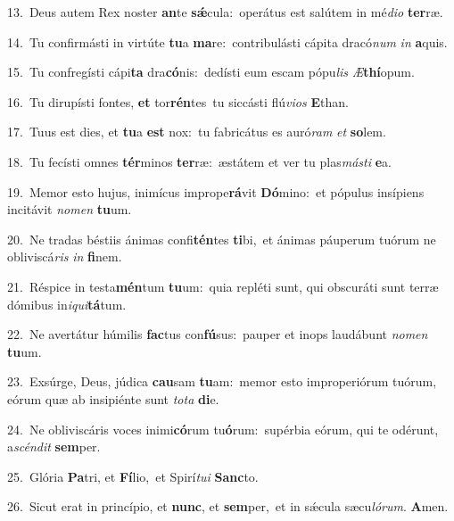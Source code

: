 {\numbfont\textcolor{\numbcolor}{13.}}~Deus autem Rex noster \textbf{an}\-te \textbf{sǽ}\-cula:~\star operátus est salútem in mé\-\textit{di}\-\textit{o} \textbf{ter}\-ræ.\par
{\numbfont\textcolor{\numbcolor}{14.}}~Tu confirmásti in virtúte \textbf{tu}\-a \textbf{ma}\-re:~\star contribulásti cápita dracó\textit{num} \textit{in} \textbf{a}\-quis.\par
{\numbfont\textcolor{\numbcolor}{15.}}~Tu confregísti cápi\textbf{ta} dra\-\textbf{có}\-nis:~\star dedísti eum escam pópu\textit{lis} \textit{Æ}\-\textbf{thí}opum.\par
{\numbfont\textcolor{\numbcolor}{16.}}~Tu dirupísti fontes, \textbf{et} tor\-\textbf{rén}\-tes~\star tu siccásti flú\-\textit{vi}\-\textit{os} \textbf{E}\-than.\par
{\numbfont\textcolor{\numbcolor}{17.}}~Tuus est dies, et \textbf{tu}\-a \textbf{est} nox:~\star tu fabricátus es auró\textit{ram} \textit{et} \textbf{so}\-lem.\par
{\numbfont\textcolor{\numbcolor}{18.}}~Tu fecísti omnes \textbf{tér}\-minos \textbf{ter}\-ræ:~\star æstátem et ver tu plas\-\textit{más}\-\textit{ti} \textbf{e}\-a.\par
{\numbfont\textcolor{\numbcolor}{19.}}~Memor esto hujus, inimícus imprope\-\textbf{rá}\-vit \textbf{Dó}\-mino:~\star et pópulus insípiens incitávit \textit{no}\-\textit{men} \textbf{tu}\-um.\par
{\numbfont\textcolor{\numbcolor}{20.}}~Ne tradas béstiis ánimas confi\-\textbf{tén}\-tes \textbf{ti}\-bi,~\star et ánimas páuperum tuórum ne obliviscá\textit{ris} \textit{in} \textbf{fi}\-nem.\par
{\numbfont\textcolor{\numbcolor}{21.}}~Réspice in testa\-\textbf{mén}\-tum \textbf{tu}\-um:~\star quia repléti sunt, qui obscuráti sunt terræ dómibus in\-\textit{i}\-\textit{qui}\textbf{tá}tum.\par
{\numbfont\textcolor{\numbcolor}{22.}}~Ne avertátur húmilis \textbf{fac}\-tus con\-\textbf{fú}\-sus:~\star pauper et inops laudábunt \textit{no}\-\textit{men} \textbf{tu}\-um.\par
{\numbfont\textcolor{\numbcolor}{23.}}~Exsúrge, Deus, júdica \textbf{cau}\-sam \textbf{tu}\-am:~\star memor esto improperiórum tuórum, eórum quæ ab insipiénte sunt \textit{to}\-\textit{ta} \textbf{di}\-e.\par
{\numbfont\textcolor{\numbcolor}{24.}}~Ne obliviscáris voces inimi\-\textbf{có}\-rum tu\-\textbf{ó}\-rum:~\star supérbia eórum, qui te odérunt, a\-\textit{scén}\-\textit{dit} \textbf{sem}\-per.\par
{\numbfont\textcolor{\numbcolor}{25.}}~Glória \textbf{Pa}\-tri, et \textbf{Fí}\-lio,~\star et Spirí\-\textit{tu}\-\textit{i} \textbf{Sanc}\-to.\par
{\numbfont\textcolor{\numbcolor}{26.}}~Sicut erat in princípio, et \textbf{nunc}\-, et \textbf{sem}\-per,~\star et in sǽcula sæcu\-\textit{ló}\-\textit{rum}. \textbf{A}\-men.\par
